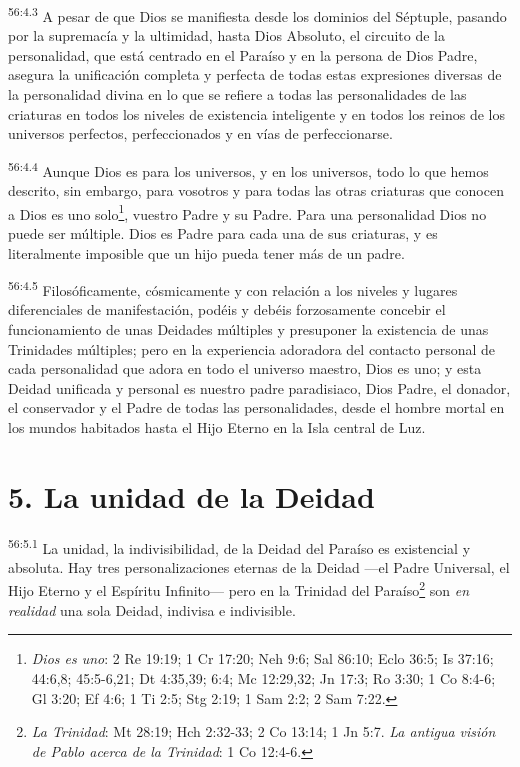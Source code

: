 \par
\textsuperscript{56:4.3} A pesar de que Dios se manifiesta desde los dominios del Séptuple, pasando por la supremacía y la ultimidad, hasta Dios Absoluto, el circuito de la personalidad, que está centrado en el Paraíso y en la persona de Dios Padre, asegura la unificación completa y perfecta de todas estas expresiones diversas de la personalidad divina en lo que se refiere a todas las personalidades de las criaturas en todos los niveles de existencia inteligente y en todos los reinos de los universos perfectos, perfeccionados y en vías de perfeccionarse.

\par
\textsuperscript{56:4.4} Aunque Dios es para los universos, y en los universos, todo lo que hemos descrito, sin embargo, para vosotros y para todas las otras criaturas que conocen a Dios es uno solo\footnote{\textit{Dios es uno}: 2 Re 19:19; 1 Cr 17:20; Neh 9:6; Sal 86:10; Eclo 36:5; Is 37:16; 44:6,8; 45:5-6,21; Dt 4:35,39; 6:4; Mc 12:29,32; Jn 17:3; Ro 3:30; 1 Co 8:4-6; Gl 3:20; Ef 4:6; 1 Ti 2:5; Stg 2:19; 1 Sam 2:2; 2 Sam 7:22.}, vuestro Padre y su Padre. Para una personalidad Dios no puede ser múltiple. Dios es Padre para cada una de sus criaturas, y es literalmente imposible que un hijo pueda tener más de un padre.

\par
\textsuperscript{56:4.5} Filosóficamente, cósmicamente y con relación a los niveles y lugares diferenciales de manifestación, podéis y debéis forzosamente concebir el funcionamiento de unas Deidades múltiples y presuponer la existencia de unas Trinidades múltiples; pero en la experiencia adoradora del contacto personal de cada personalidad que adora en todo el universo maestro, Dios es uno; y esta Deidad unificada y personal es nuestro padre paradisiaco, Dios Padre, el donador, el conservador y el Padre de todas las personalidades, desde el hombre mortal en los mundos habitados hasta el Hijo Eterno en la Isla central de Luz.

\section*{5. La unidad de la Deidad}
\par
\textsuperscript{56:5.1} La unidad, la indivisibilidad, de la Deidad del Paraíso es existencial y absoluta. Hay tres personalizaciones eternas de la Deidad ---el Padre Universal, el Hijo Eterno y el Espíritu Infinito--- pero en la Trinidad del Paraíso\footnote{\textit{La Trinidad}: Mt 28:19; Hch 2:32-33; 2 Co 13:14; 1 Jn 5:7. \textit{La antigua visión de Pablo acerca de la Trinidad}: 1 Co 12:4-6.} son \textit{en realidad} una sola Deidad, indivisa e indivisible.

